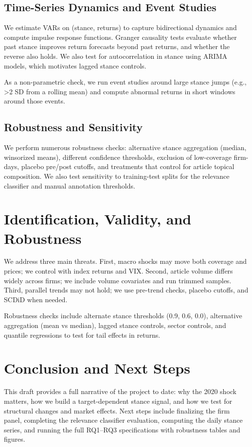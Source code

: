\documentclass[conference]{IEEEtran}
\begin{document}
\subsection{Time-Series Dynamics and Event Studies}
We estimate VARs on (stance, returns) to capture bidirectional dynamics and compute impulse response functions. Granger causality tests evaluate whether past stance improves return forecasts beyond past returns, and whether the reverse also holds. We also test for autocorrelation in stance using ARIMA models, which motivates lagged stance controls.

As a non-parametric check, we run event studies around large stance jumps (e.g., >2 SD from a rolling mean) and compute abnormal returns in short windows around those events.

\subsection{Robustness and Sensitivity}
We perform numerous robustness checks: alternative stance aggregation (median, winsorized means), different confidence thresholds, exclusion of low-coverage firm-days, placebo pre/post cutoffs, and treatments that control for article topical composition. We also test sensitivity to training-test splits for the relevance classifier and manual annotation thresholds.

\section{Identification, Validity, and Robustness}
We address three main threats. First, macro shocks may move both coverage and prices; we control with index returns and VIX. Second, article volume differs widely across firms; we include volume covariates and run trimmed samples. Third, parallel trends may not hold; we use pre-trend checks, placebo cutoffs, and SCDiD when needed.

Robustness checks include alternate stance thresholds (0.9, 0.6, 0.0), alternative aggregation (mean vs median), lagged stance controls, sector controls, and quantile regressions to test for tail effects in returns.

\section{Conclusion and Next Steps}
This draft provides a full narrative of the project to date: why the 2020 shock matters, how we build a target-dependent stance signal, and how we test for structural changes and market effects. Next steps include finalizing the firm panel, completing the relevance classifier evaluation, computing the daily stance series, and running the full RQ1--RQ3 specifications with robustness tables and figures.
\end{document}
